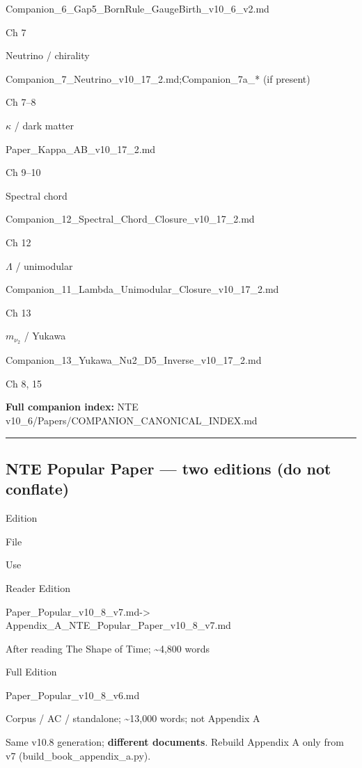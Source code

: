 \documentclass[
  11pt,
]{article}
\begin{document}
Companion\_6\_Gap5\_BornRule\_GaugeBirth\_v10\_6\_v2.md

Ch 7

Neutrino / chirality

Companion\_7\_Neutrino\_v10\_17\_2.md;Companion\_7a\_* (if present)

Ch 7--8

\(\kappa\) / dark matter

Paper\_Kappa\_AB\_v10\_17\_2.md

Ch 9--10

Spectral chord

Companion\_12\_Spectral\_Chord\_Closure\_v10\_17\_2.md

Ch 12

\(\Lambda\) / unimodular

Companion\_11\_Lambda\_Unimodular\_Closure\_v10\_17\_2.md

Ch 13

\(m_{\nu_2}\) / Yukawa

Companion\_13\_Yukawa\_Nu2\_D5\_Inverse\_v10\_17\_2.md

Ch 8, 15

\textbf{Full companion index:} NTE
v10\_6/Papers/COMPANION\_CANONICAL\_INDEX.md

\begin{center}\rule{0.5\linewidth}{0.5pt}\end{center}

\subsection{NTE Popular Paper --- two editions (do not
conflate)}\label{nte-popular-paper-two-editions-do-not-conflate}

Edition

File

Use

Reader Edition

Paper\_Popular\_v10\_8\_v7.md-\textgreater{}
Appendix\_A\_NTE\_Popular\_Paper\_v10\_8\_v7.md

After reading The Shape of Time; \textasciitilde4,800 words

Full Edition

Paper\_Popular\_v10\_8\_v6.md

Corpus / AC / standalone; \textasciitilde13,000 words; not Appendix A

Same v10.8 generation; \textbf{different documents}. Rebuild Appendix A
only from v7 (build\_book\_appendix\_a.py).
\end{document}
